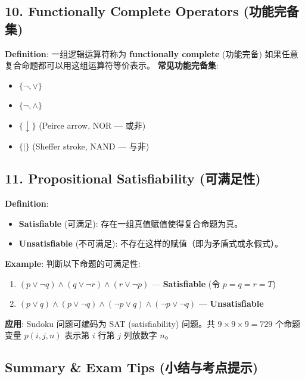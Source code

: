 \documentclass[10pt,a4paper,openany]{ctexbook}
\theoremstyle{definition}
\theoremstyle{remark}
\begin{document}
\subsection{10. Functionally Complete Operators (功能完备集)}

\textbf{Definition}: 一组逻辑运算符称为 \textbf{functionally complete} (功能完备) 如果任意复合命题都可以用这组运算符等价表示。
\textbf{常见功能完备集}:
\begin{itemize}
\item $\{\neg, \lor\}$
\item $\{\neg, \land\}$
\item $\{\downarrow\}$ (Peirce arrow, NOR — 或非)
\item $\{\mid\}$ (Sheffer stroke, NAND — 与非)

\end{itemize}

\vspace{-2pt}

\subsection{11. Propositional Satisfiability (可满足性)}

\textbf{Definition}:
\begin{itemize}
\item \textbf{Satisfiable} (可满足): 存在一组真值赋值使得复合命题为真。
\item \textbf{Unsatisfiable} (不可满足): 不存在这样的赋值（即为矛盾式或永假式）。

\end{itemize}

\textbf{Example}: 判断以下命题的可满足性:
\begin{enumerate}
\item $(p \lor \neg q) \land (q \lor \neg r) \land (r \lor \neg p)$ — \textbf{Satisfiable} (令 $p=q=r=T$)
\item $(p \lor q) \land (p \lor \neg q) \land (\neg p \lor q) \land (\neg p \lor \neg q)$ — \textbf{Unsatisfiable}

\end{enumerate}

\textbf{应用}: Sudoku 问题可编码为 SAT (satisfiability) 问题。共 $9 \times 9 \times 9 = 729$ 个命题变量 $p(i,j,n)$ 表示第 $i$ 行第 $j$ 列放数字 $n$。
\vspace{-2pt}

\subsection{Summary \& Exam Tips (小结与考点提示)}
\end{document}
